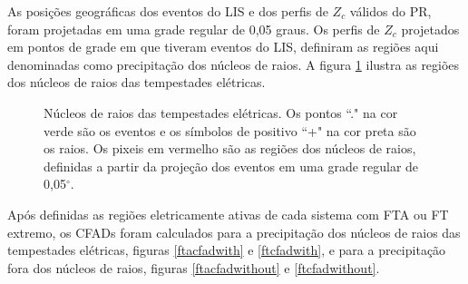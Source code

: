 As posições geográficas dos eventos do LIS e dos perfis de $Z_c$ válidos do PR, foram projetadas em uma grade regular de 0,05 graus. Os perfis de $Z_c$ projetados em pontos de grade em que tiveram eventos do LIS, definiram as regiões aqui denominadas como precipitação dos núcleos de raios. A figura \ref{nucleosRaios} ilustra as regiões dos núcleos de raios das tempestades elétricas.


\begin{figure}[!htb]
  \caption{Núcleos de raios das tempestades elétricas. Os pontos ``." na cor  verde são os eventos e os símbolos de positivo ``+" na cor preta são os raios. Os pixeis em vermelho são as regiões dos núcleos de raios, definidas a partir da projeção dos eventos em uma grade regular de 0,05$^{\circ}$.} %
\label{nucleosRaios}
\end{figure}



Após definidas as regiões eletricamente ativas de cada sistema com FTA ou FT extremo, os CFADs foram calculados para a precipitação dos núcleos de raios das tempestades elétricas, figuras \ref{ftacfadwith} e \ref{ftcfadwith}, e para a precipitação fora dos núcleos de raios, figuras \ref{ftacfadwithout} e \ref{ftcfadwithout}.

